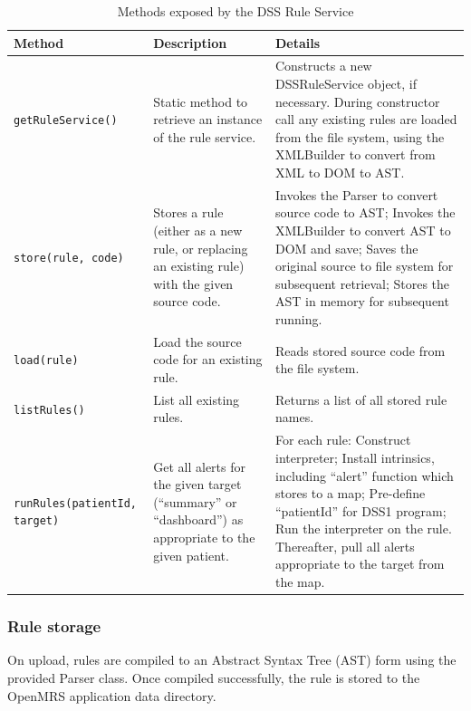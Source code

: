 \documentclass[12pt,letterpaper]{article}
\begin{document}
{\begin{table}
\begin{center}
\begin{tabular}{ l | p{1.25in} | p{2.25in} }
Method & Description & Details \\ \hline

\texttt{getRuleService()}
&
Static method to retrieve an instance of the rule service.
&
Constructs a new DSSRuleService object, if necessary. During 
constructor call any existing rules are loaded from the file 
system, using the XMLBuilder to convert from XML to DOM to AST.
\\ \hline

\texttt{store(rule, code)}
&
Stores a rule (either as a new rule, or replacing an existing rule) with the given source code.
&
Invokes the Parser to convert source code to AST; 
Invokes the XMLBuilder to convert AST to DOM and save; 
Saves the original source to file system for subsequent retrieval; 
Stores the AST in memory for subsequent running.
\\ \hline

\texttt{load(rule)}
&
Load the source code for an existing rule.
&
Reads stored source code from the file system.
\\ \hline

\texttt{listRules()}
&
List all existing rules.
&
Returns a list of all stored rule names.
\\ \hline

\texttt{runRules(patientId, target)}
&
Get all alerts for the given target (“summary” or “dashboard”) as appropriate to the given patient.
&
For each rule:
Construct interpreter; 
Install intrinsics, including “alert” function which stores to a map;
Pre-define “patientId” for DSS1 program;
Run the interpreter on the rule.
Thereafter, pull all alerts appropriate to the target from the map.
\\ \hline

\end{tabular}
\end{center}
\caption{Methods exposed by the DSS Rule Service}
\label{tab:RULE_SERVICE}
\end{table}

\subsubsection{Rule storage} \label{sec:RULE_STORAGE}

On upload, rules are compiled to an Abstract Syntax Tree (AST) form 
using the provided Parser class. Once compiled successfully, the rule is stored to the OpenMRS application data directory. 

}
\end{document}
